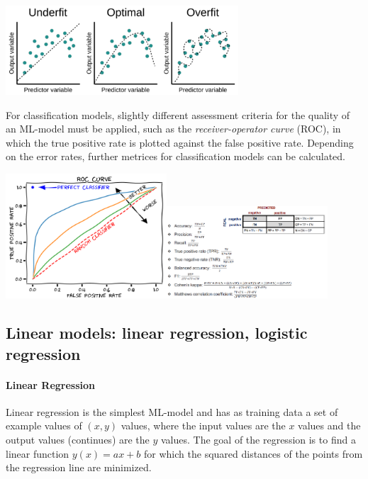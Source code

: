 \begin{center}\includegraphics[width=0.65\textwidth]{img/machine/MachineOverUnderFiting.png}\end{center}

For classification models, slightly different assessment criteria for the quality of an ML-model must be applied, such as the \emph{receiver-operator curve} (ROC), in which the true positive rate is plotted against the false positive rate. Depending on the error rates, further metrices for classification models can be calculated.

\begin{center}\includegraphics[width=0.45\textwidth]{img/machine/MachineRocCurve.png}\includegraphics[width=0.45\textwidth]{img/machine/MachineClassificationMetrices.png}\end{center}

\subsection{Linear models: linear regression, logistic regression}

\paragraph{Linear Regression}
Linear regression is the simplest ML-model and has as training data a set of example values of $(x,y)$ values, where the input values are the $x$ values and the output values (continues) are the $y$ values. The goal of the regression is to find a linear function $y(x)=ax+b$ for which the squared distances of the points from the regression line are minimized. 

